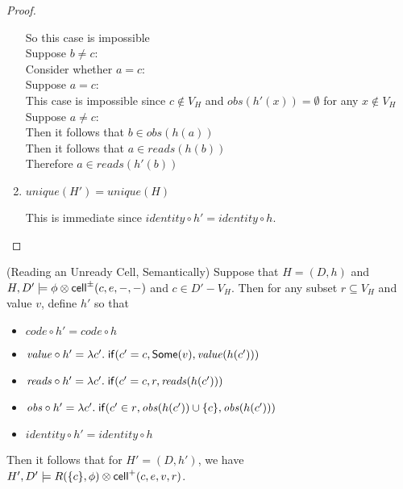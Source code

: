 \begin{proof}
\begin{enumerate}
\begin{tabbedproof}
    \ooooo So this case is impossible \\
    \ooo Suppose $b \not= c$: \\
    \oooo Consider whether $a = c$: \\
    \oooo Suppose $a = c$: \\
    \ooooo This case is impossible since $c \not\in V_H$ and $\mathit{obs}(h'(x)) = \emptyset$ for any $x \not\in V_H$ \\
    \oooo Suppose $a \not= c$: \\
    \ooooo Then it follows that $b \in \mathit{obs}(h(a))$ \\
    \ooooo Then it follows that $a \in \mathit{reads}(h(b))$ \\
    \ooooo Therefore $a \in \mathit{reads}(h'(b))$ 
  \end{tabbedproof}

\item $\mathit{unique}(H') = \mathit{unique}(H)$

This is immediate since $\mathit{identity} \circ h' = \mathit{identity} \circ h$.
\end{enumerate}
\end{proof}

\begin{lemma}{(Reading an Unready Cell, Semantically)}
Suppose that $H = (D,h)$ and $H, D' \models \phi \otimes
\mathsf{cell}^{\pm}({c}, {e}, {-}, {-})$ and $c \in D' - V_H$. Then for any subset $r
\subseteq V_H$ and value $v$, define $h'$ so that
\begin{itemize}
\item $\mathit{code} \circ h' = \mathit{code} \circ h$ 
\item $\mathit{value} \circ h' = \lambda c'.\;\mathsf{if}({c' = c}, {\mathsf{Some}(v)}, {\mathit{value}(h(c'))})$ 
\item $\mathit{reads} \circ h' = \lambda c'.\;\mathsf{if}({c' = c}, {r}, {\mathit{reads}(h(c'))})$ 
\item $\mathit{obs} \circ h' = \lambda c'.\;\mathsf{if}({c' \in r}, {\mathit{obs}(h(c')) \cup \{{c}\}}, {\mathit{obs}(h(c'))})$ 
\item $\mathit{identity} \circ h' = \mathit{identity} \circ h$
\end{itemize}
Then it follows that for $H' = (D,h')$, we have $H', D' \models R(\{{c}\}, \phi) \otimes \mathsf{cell}^{+}({c}, {e}, {v}, {r})$.
\end{lemma}

